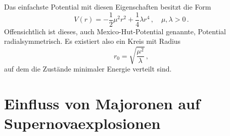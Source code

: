 Das einfachste Potential mit diesen Eigenschaften besitzt die Form
\begin{equation}
    V(r) = -\frac{1}{2} \mu^2 r^2 + \frac{1}{4} \lambda r^4 \,, \quad \mu,\lambda > 0 \,.
\end{equation}
Offensichtlich ist dieses, auch Mexico-Hut-Potential genannte, Potential radialsymmetrisch.
Es existiert also ein Kreis mit Radius
\begin{equation*}
    r_0 = \sqrt{\frac{\mu^2}{\lambda}} \,,
\end{equation*}
auf dem die Zustände minimaler Energie verteilt sind.


\section{Einfluss von Majoronen auf Supernovaexplosionen}

